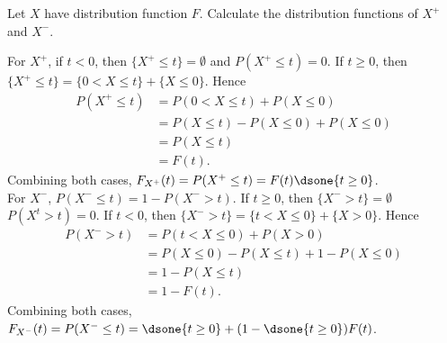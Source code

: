 \begin{exercise}
  Let $X$ have distribution function $F$. Calculate the distribution functions of $X^+$ and $X^-$.
\end{exercise}
\begin{solution}
  For $X^+$, if $t<0$, then $\{X^+\leq t\}=\emptyset$ and $P(X^+\leq t)=0$. If $t\geq 0$, then $\{X^+\leq t\} = \{0<X\leq t\}+\{X\leq 0\}$. Hence
  \begin{align*}
    P(X^+\leq t) &= P(0<X\leq t) + P(X\leq 0) \\
      &= P(X\leq t) - P(X\leq 0) + P(X\leq 0) \\
      &= P(X\leq t) \\
      &= F(t) .
  \end{align*}
  Combining both cases, $F_{X^+}(t)=P(X^+\leq t) = F(t)\dsone\{t\geq 0\}$. \\

  For $X^-$, $P(X^-\leq t) = 1 - P(X^->t)$. If $t\geq 0$, then $\{X^->t\}=\emptyset$ $P(X^t>t) = 0$. If $t<0$, then $\{X^->t\} = \{t<X\leq 0\}+\{X>0\}$. Hence
  \begin{align*}
    P(X^->t) &= P(t<X\leq 0) + P(X> 0) \\
      &= P(X\leq 0) - P(X\leq t) + 1 - P(X\leq 0) \\
      &= 1 - P(X\leq t) \\
      &= 1 - F(t) .
  \end{align*}
  Combining both cases, $F_{X^-}(t)=P(X^-\leq t) = \dsone\{t\geq 0\} + (1-\dsone\{t\geq 0\})F(t)$.
\end{solution}
